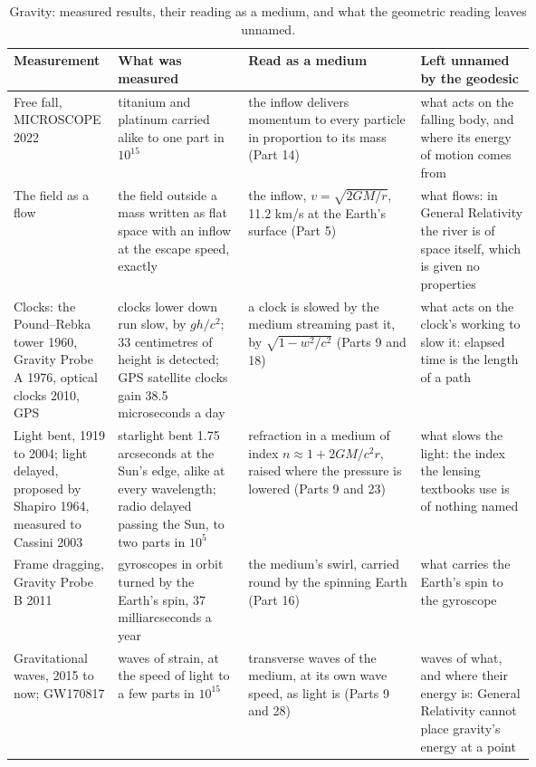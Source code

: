 \documentclass[11pt,a4paper]{article}
\begin{document}
\begin{table}[p]\centering\footnotesize
\caption{Gravity: measured results, their reading as a medium, and what the geometric reading leaves unnamed.}
\renewcommand{\arraystretch}{1.08}\begin{tabularx}{\linewidth}{@{}>{\raggedright\arraybackslash}p{0.2\linewidth} >{\raggedright\arraybackslash}p{0.25\linewidth} >{\raggedright\arraybackslash}X >{\raggedright\arraybackslash}p{0.22\linewidth}@{}}\toprule
\textbf{Measurement} & \textbf{What was measured} & \textbf{Read as a medium} & \textbf{Left unnamed by the geodesic}\\\midrule
Free fall, MICROSCOPE 2022 & titanium and platinum carried alike to one part in $10^{15}$ & the inflow delivers momentum to every particle in proportion to its mass (Part 14) & what acts on the falling body, and where its energy of motion comes from\\
The field as a flow & the field outside a mass written as flat space with an inflow at the escape speed, exactly & the inflow, $v=\sqrt{2GM/r}$, 11.2 km/s at the Earth's surface (Part 5) & what flows: in General Relativity the river is of space itself, which is given no properties\\
Clocks: the Pound--Rebka tower 1960, Gravity Probe A 1976, optical clocks 2010, GPS & clocks lower down run slow, by $gh/c^2$; 33 centimetres of height is detected; GPS satellite clocks gain 38.5 microseconds a day & a clock is slowed by the medium streaming past it, by $\sqrt{1-w^2/c^2}$ (Parts 9 and 18) & what acts on the clock's working to slow it: elapsed time is the length of a path\\
Light bent, 1919 to 2004; light delayed, proposed by Shapiro 1964, measured to Cassini 2003 & starlight bent 1.75 arcseconds at the Sun's edge, alike at every wavelength; radio delayed passing the Sun, to two parts in $10^{5}$ & refraction in a medium of index $n\approx1+2GM/c^2r$, raised where the pressure is lowered (Parts 9 and 23) & what slows the light: the index the lensing textbooks use is of nothing named\\
Frame dragging, Gravity Probe B 2011 & gyroscopes in orbit turned by the Earth's spin, 37 milliarcseconds a year & the medium's swirl, carried round by the spinning Earth (Part 16) & what carries the Earth's spin to the gyroscope\\
Gravitational waves, 2015 to now; GW170817 & waves of strain, at the speed of light to a few parts in $10^{15}$ & transverse waves of the medium, at its own wave speed, as light is (Parts 9 and 28) & waves of what, and where their energy is: General Relativity cannot place gravity's energy at a point\\

\end{tabularx}
\end{table}
\end{document}
